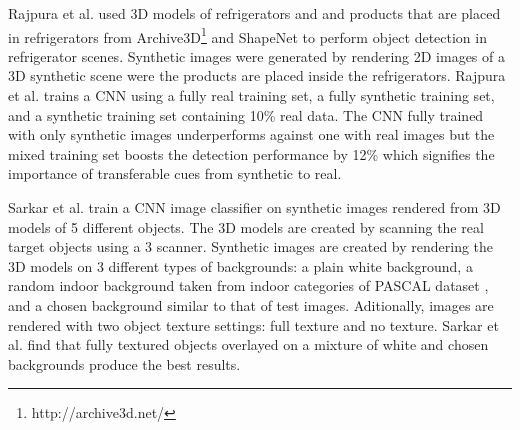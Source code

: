 Rajpura et al. \cite{rajpura2017object} used 3D models of refrigerators and and products that are placed in refrigerators from Archive3D\footnote{http://archive3d.net/} and ShapeNet \cite{chang2015shapenet} to perform object detection in refrigerator scenes. Synthetic images were generated by rendering 2D images of a 3D synthetic scene were the products are placed inside the refrigerators. Rajpura et al. trains a CNN using a fully real training set, a fully synthetic training set, and a synthetic training set containing 10\% real data. The CNN fully trained with only synthetic images  underperforms against one with real images but the mixed training set boosts the detection performance by 12\% which signifies the importance of transferable cues from synthetic to real.

Sarkar et al. \cite{sarkar2017trained} train a CNN image classifier on synthetic images rendered from 3D models of 5 different objects. The 3D models are created by scanning the real target objects using a 3 scanner. Synthetic images are created by rendering the 3D models on 3 different types of backgrounds: a plain white background, a random indoor background taken from indoor categories of PASCAL dataset \cite{everingham2010pascal}, and a chosen background similar to that of test images. Aditionally, images are rendered with two object texture settings: full texture and no texture. Sarkar et al. find that fully textured objects overlayed on a mixture of white and chosen backgrounds produce the best results.
